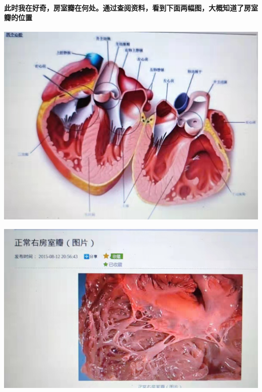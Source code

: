 \documentclass[final,11pt,oneside,UTF8]{report}
\begin{document}
\paragraph{
    此时我在好奇，房室瓣在何处。通过查阅资料，看到下面两幅图，大概知道了房室瓣的位置
}
\begin{center}
    \includegraphics[scale=0.1,angle=0]{photos/example1.jpg}
\end{center}
\begin{center}
    \includegraphics[scale=0.1,angle=0]{photos/example2.jpg}
\end{center}
\end{document}
